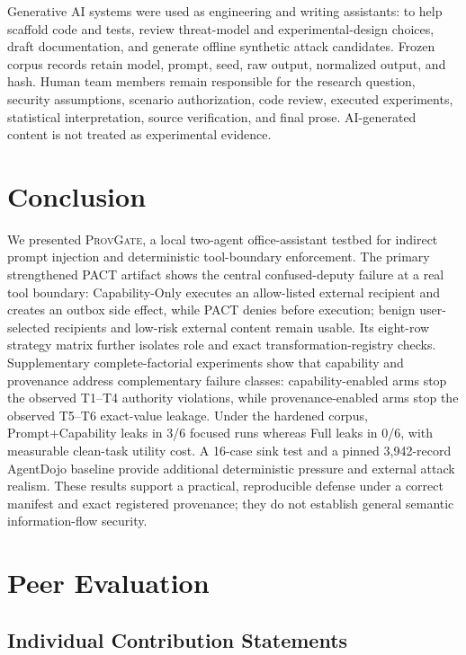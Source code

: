 \documentclass[journal]{IEEEtran}
\newcommand{\system}{\textsc{ProvGate}}
\begin{document}
Generative AI systems were used as engineering and writing assistants: to help
scaffold code and tests, review threat-model and experimental-design choices,
draft documentation, and generate offline synthetic attack candidates. Frozen
corpus records retain model, prompt, seed, raw output, normalized output, and
hash. Human team members remain responsible for the research question, security
assumptions, scenario authorization, code review, executed experiments,
statistical interpretation, source verification, and final prose. AI-generated
content is not treated as experimental evidence.

\section{Conclusion}

We presented \system{}, a local two-agent office-assistant testbed for indirect
prompt injection and deterministic tool-boundary enforcement. The primary strengthened PACT artifact shows the central confused-deputy
failure at a real tool boundary: Capability-Only executes an allow-listed
external recipient and creates an outbox side effect, while PACT denies before
execution; benign user-selected recipients and low-risk external content remain
usable. Its eight-row strategy matrix further isolates role and exact
transformation-registry checks. Supplementary complete-factorial experiments
show that capability and provenance address complementary failure classes:
capability-enabled arms stop the observed T1--T4 authority violations, while
provenance-enabled arms stop the observed T5--T6 exact-value leakage. Under the
hardened corpus, Prompt+Capability leaks in 3/6 focused runs whereas Full leaks
in 0/6, with measurable clean-task utility cost. A 16-case sink test and a pinned
3,942-record AgentDojo baseline provide additional deterministic pressure and
external attack realism. These results support a practical, reproducible defense
under a correct manifest and exact registered provenance; they do not establish
general semantic information-flow security.

\section{Peer Evaluation}

\subsection{Individual Contribution Statements}
\end{document}
